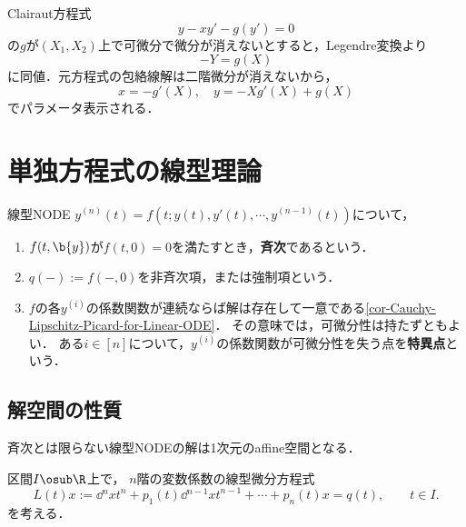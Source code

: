 \documentclass[uplatex,dvipdfmx]{jsreport}
\begin{document}
\begin{example}
    Clairaut方程式
    \[y-xy'-g(y')=0\]
    の$g$が$(X_1,X_2)$上で可微分で微分が消えないとすると，Legendre変換より
    \[-Y=g(X)\]
    に同値．元方程式の包絡線解は二階微分が消えないから，
    \[x=-g'(X),\quad y=-Xg'(X)+g(X)\]
    でパラメータ表示される．
\end{example}

\section{単独方程式の線型理論}

\begin{definition}[homogeneous]
    線型NODE $y^{(n)}(t)=f(t;y(t),y'(t),\cdots,y^{(n-1)}(t))$について，
    \begin{enumerate}
        \item $f(t,\b{y})$が$f(t,0)=0$を満たすとき，\textbf{斉次}であるという．
        \item $q(-):=f(-,0)$を非斉次項，または強制項という．
        \item $f$の各$y^{(i)}$の係数関数が連続ならば解は存在して一意である\ref{cor-Cauchy-Lipschitz-Picard-for-Linear-ODE}．
        その意味では，可微分性は持たずともよい．
        ある$i\in[n]$について，$y^{(i)}$の係数関数が可微分性を失う点を\textbf{特異点}という．
    \end{enumerate}
\end{definition}

\subsection{解空間の性質}

\begin{tcolorbox}[colframe=ForestGreen, colback=ForestGreen!10!white,breakable,colbacktitle=ForestGreen!40!white,coltitle=black,fonttitle=\bfseries\sffamily,
title=]
    斉次とは限らない線型NODEの解は1次元のaffine空間となる．
\end{tcolorbox}

\begin{problem}\label{prob-nth-order-linear-ODE}
    区間$I\osub\R$上で，
    $n$階の変数係数の線型微分方程式
    \[L(t)x:=\dd{^nx}{t^n}+p_1(t)\dd{^{n-1}x}{t^{n-1}}+\cdots+p_n(t)x=q(t),\qquad t\in I.\]
    を考える．
\end{problem}
\end{document}
